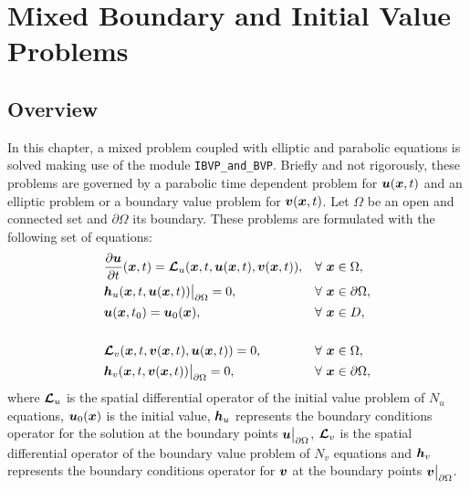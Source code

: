      
\chapter{Mixed Boundary and Initial Value Problems   }\label{user:IBVP_BVP}
\vspace{-1cm}
\section{Overview}
 In this chapter, a mixed problem coupled with elliptic and parabolic equations  is solved making use of the module \verb|IBVP_and_BVP|. 
 Briefly and not rigorously, these problems are governed by a parabolic time dependent problem for $\boldsymbol{u}(\boldsymbol{x}, t)$ and an elliptic problem or a boundary value problem for $\boldsymbol{v}(\boldsymbol{x}, t)$. 
 Let $\Omega $  
 be an open and connected set and $\partial \Omega$ its boundary. 
 These problems are formulated with the following set of equations: 
           \begin{align*}
           & \frac{\partial \boldsymbol{u} }{\partial t}(\boldsymbol{x},t) =\boldsymbol{\mathcal{L}}_u (\boldsymbol{x},t,\boldsymbol{u}(\boldsymbol{x},t),\boldsymbol{v}(\boldsymbol{x},t)) ,   & \forall & \ \boldsymbol{x} \in  \Omega, \\
           & \boldsymbol{h}_u (\boldsymbol{x},t,\boldsymbol{u}(\boldsymbol{x},t))\big\rvert_{\partial \Omega}=0 , & \forall & \ \boldsymbol{x} \in \partial \Omega, \\ 
           & \boldsymbol{u}(\boldsymbol{x},t_0)=\boldsymbol{u}_0(\boldsymbol{x}),  & \forall & \ \boldsymbol{x} \in  D, \\ \\
           & \boldsymbol{\mathcal{L}}_v (\boldsymbol{x},t,\boldsymbol{v}(\boldsymbol{x},t),\boldsymbol{u}(\boldsymbol{x},t)) = 0 ,  & \forall & \ \boldsymbol{x} \in  \Omega, \\
           & \boldsymbol{h}_v (\boldsymbol{x},t,\boldsymbol{v}(\boldsymbol{x},t))\big\rvert_{\partial \Omega}=0 , & \forall & \ \boldsymbol{x} \in \partial \Omega,
           \end{align*}
 where $\boldsymbol{\mathcal{L}}_u$ is the spatial differential operator of the initial value problem of $N_u$ equations, $\boldsymbol{u}_0(\boldsymbol{x})$ is the initial value, $\boldsymbol{h}_u$ represents the boundary conditions operator for the solution at the boundary points $\boldsymbol{u} \big\rvert_{\partial \Omega}$,  $\boldsymbol{\mathcal{L}}_v$ is the spatial differential operator of the boundary value problem of $N_v$ equations and $\boldsymbol{h}_v$ represents the boundary conditions operator for $\boldsymbol{v}$  at the boundary points $\boldsymbol{v} \big\rvert_{\partial \Omega}$. 
       
